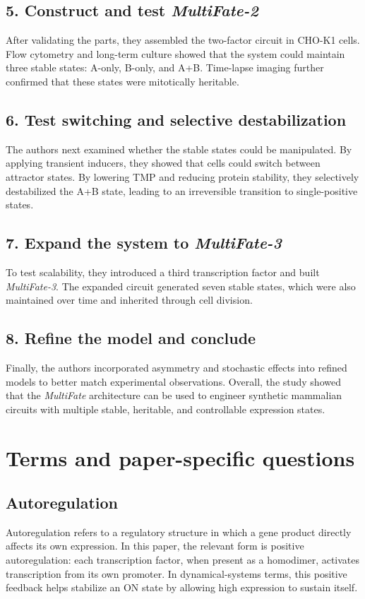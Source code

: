 \documentclass[12pt,a4paper]{article}
\begin{document}
\subsection*{5. Construct and test \textit{MultiFate-2}}
After validating the parts, they assembled the two-factor circuit in CHO-K1 cells. Flow cytometry and long-term culture showed that the system could maintain three stable states: A-only, B-only, and A+B. Time-lapse imaging further confirmed that these states were mitotically heritable.

\subsection*{6. Test switching and selective destabilization}
The authors next examined whether the stable states could be manipulated. By applying transient inducers, they showed that cells could switch between attractor states. By lowering TMP and reducing protein stability, they selectively destabilized the A+B state, leading to an irreversible transition to single-positive states.

\subsection*{7. Expand the system to \textit{MultiFate-3}}
To test scalability, they introduced a third transcription factor and built \textit{MultiFate-3}. The expanded circuit generated seven stable states, which were also maintained over time and inherited through cell division.

\subsection*{8. Refine the model and conclude}
Finally, the authors incorporated asymmetry and stochastic effects into refined models to better match experimental observations. Overall, the study showed that the \textit{MultiFate} architecture can be used to engineer synthetic mammalian circuits with multiple stable, heritable, and controllable expression states.

\section{Terms and paper-specific questions}

\subsection{Autoregulation}
Autoregulation refers to a regulatory structure in which a gene product directly affects its own expression. In this paper, the relevant form is positive autoregulation: each transcription factor, when present as a homodimer, activates transcription from its own promoter. In dynamical-systems terms, this positive feedback helps stabilize an ON state by allowing high expression to sustain itself.
\end{document}

